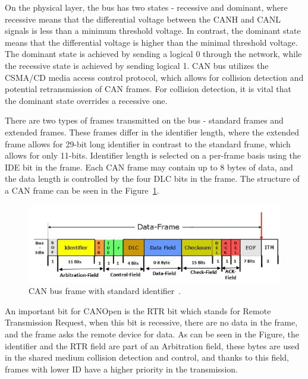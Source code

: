 On the physical layer, the bus has two states - recessive and dominant, where recessive means that the differential voltage between the CANH and CANL signals is less than a minimum threshold voltage.
In contrast, the dominant state means that the differential voltage is higher than the minimal threshold voltage\cite{st_michael_introduction_2019}.
The dominant state is achieved by sending a logical 0 through the network, while the recessive state is achieved by sending logical 1.
CAN bus utilizes the CSMA/CD media access control protocol, which allows for collision detection and potential retransmission of CAN frames.
For collision detection, it is vital that the dominant state overrides a recessive one.

There are two types of frames transmitted on the bus - standard frames and extended frames.
These frames differ in the identifier length, where the extended frame allows for 29-bit long identifier in contrast to the standard frame, which allows for only 11-bits.
Identifier length is selected on a per-frame basis using the IDE bit in the frame.
Each CAN frame may contain up to 8 bytes of data, and the data length is controlled by the four DLC bits in the frame.
The structure of a CAN frame can be seen in the Figure~\ref{fig:can_frame}.

\begin{figure}[H]
    \centering
    \includegraphics[width=\textwidth]{obrazky/can_frame}
    \caption{CAN bus frame with standard identifier~\cite{piembsystech_can_nodate}.}
    \label{fig:can_frame}
\end{figure}

An important bit for CANOpen is the RTR bit which stands for Remote Transmission Request, when this bit is recessive, there are no data in the frame, and the frame asks the remote device for data.
As can be seen in the Figure, the identifier and the RTR field are part of an Arbitration field, these bytes are used in the shared medium collision detection and control, and thanks to this field, frames with lower ID have a higher priority in the transmission.

